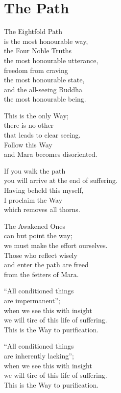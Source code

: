 
\chapter{The Path}


The Eightfold Path\\
is the most honourable way,\\
the Four Noble Truths\\
the most honourable utterance,\\
freedom from craving\\
the most honourable state,\\
and the all-seeing Buddha\\
the most honourable being.


This is the only Way;\\
there is no other\\
that leads to clear seeing.\\
Follow this Way\\
and Mara becomes disoriented.


If you walk the path\\
you will arrive at the end of suffering.\\
Having beheld this myself,\\
I proclaim the Way\\
which removes all thorns.


The Awakened Ones\\
can but point the way;\\
we must make the effort ourselves.\\
Those who reflect wisely\\
and enter the path are freed\\
from the fetters of Mara.


“All conditioned things\\
are impermanent”;\\
when we see this with insight\\
we will tire of this life of suffering.\\
This is the Way to purification.


“All conditioned things\\
are inherently lacking”;\\
when we see this with insight\\
we will tire of this life of suffering.\\
This is the Way to purification.


